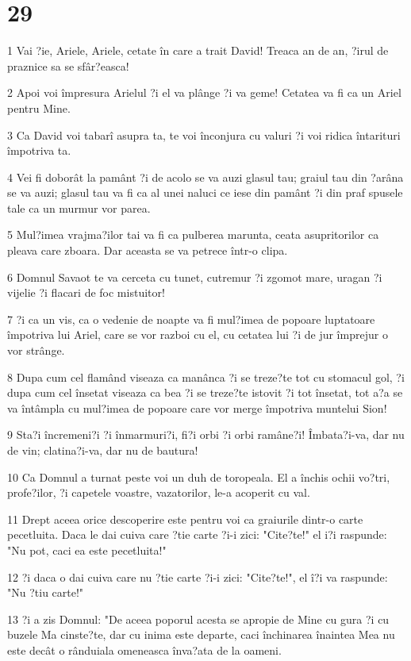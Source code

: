 \chapter{29}

\par 1 Vai ?ie, Ariele, Ariele, cetate în care a trait David! Treaca an de an, ?irul de praznice sa se sfâr?easca!
\par 2 Apoi voi împresura Arielul ?i el va plânge ?i va geme! Cetatea va fi ca un Ariel pentru Mine.
\par 3 Ca David voi tabarî asupra ta, te voi înconjura cu valuri ?i voi ridica întarituri împotriva ta.
\par 4 Vei fi doborât la pamânt ?i de acolo se va auzi glasul tau; graiul tau din ?arâna se va auzi; glasul tau va fi ca al unei naluci ce iese din pamânt ?i din praf spusele tale ca un murmur vor parea.
\par 5 Mul?imea vrajma?ilor tai va fi ca pulberea marunta, ceata asupritorilor ca pleava care zboara. Dar aceasta se va petrece într-o clipa.
\par 6 Domnul Savaot te va cerceta cu tunet, cutremur ?i zgomot mare, uragan ?i vijelie ?i flacari de foc mistuitor!
\par 7 ?i ca un vis, ca o vedenie de noapte va fi mul?imea de popoare luptatoare împotriva lui Ariel, care se vor razboi cu el, cu cetatea lui ?i de jur împrejur o vor strânge.
\par 8 Dupa cum cel flamând viseaza ca manânca ?i se treze?te tot cu stomacul gol, ?i dupa cum cel însetat viseaza ca bea ?i se treze?te istovit ?i tot însetat, tot a?a se va întâmpla cu mul?imea de popoare care vor merge împotriva muntelui Sion!
\par 9 Sta?i încremeni?i ?i înmarmuri?i, fi?i orbi ?i orbi ramâne?i! Îmbata?i-va, dar nu de vin; clatina?i-va, dar nu de bautura!
\par 10 Ca Domnul a turnat peste voi un duh de toropeala. El a închis ochii vo?tri, profe?ilor, ?i capetele voastre, vazatorilor, le-a acoperit cu val.
\par 11 Drept aceea orice descoperire este pentru voi ca graiurile dintr-o carte pecetluita. Daca le dai cuiva care ?tie carte ?i-i zici: "Cite?te!" el i?i raspunde: "Nu pot, caci ea este pecetluita!"
\par 12 ?i daca o dai cuiva care nu ?tie carte ?i-i zici: "Cite?te!", el î?i va raspunde: "Nu ?tiu carte!"
\par 13 ?i a zis Domnul: "De aceea poporul acesta se apropie de Mine cu gura ?i cu buzele Ma cinste?te, dar cu inima este departe, caci închinarea înaintea Mea nu este decât o rânduiala omeneasca înva?ata de la oameni.
